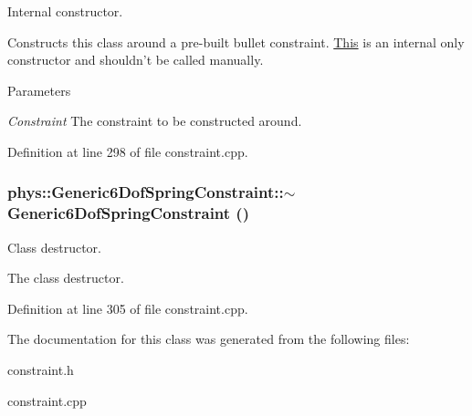 Internal constructor. 

Constructs this class around a pre-\/built bullet constraint. \hyperlink{structThis}{This} is an internal only constructor and shouldn't be called manually. 
\begin{DoxyParams}{Parameters}
\item[{\em Constraint}]The constraint to be constructed around. \end{DoxyParams}


Definition at line 298 of file constraint.cpp.

\hypertarget{classphys_1_1Generic6DofSpringConstraint_a245aa769d0b19ff01acf77e78e959cad}{
\subsubsection[{$\sim$Generic6DofSpringConstraint}]{\setlength{\rightskip}{0pt plus 5cm}phys::Generic6DofSpringConstraint::$\sim$Generic6DofSpringConstraint ()}}
\label{d1/dc7/classphys_1_1Generic6DofSpringConstraint_a245aa769d0b19ff01acf77e78e959cad}


Class destructor. 

The class destructor. 

Definition at line 305 of file constraint.cpp.



The documentation for this class was generated from the following files:\begin{DoxyCompactItemize}
\item 
constraint.h\item 
constraint.cpp\end{DoxyCompactItemize}
